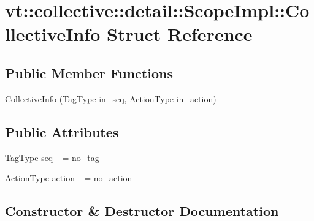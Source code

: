 \hypertarget{structvt_1_1collective_1_1detail_1_1_scope_impl_1_1_collective_info}{}\section{vt\+:\+:collective\+:\+:detail\+:\+:Scope\+Impl\+:\+:Collective\+Info Struct Reference}
\label{structvt_1_1collective_1_1detail_1_1_scope_impl_1_1_collective_info}
\subsection*{Public Member Functions}
\begin{DoxyCompactItemize}
\item 
\hyperlink{structvt_1_1collective_1_1detail_1_1_scope_impl_1_1_collective_info_a7f964b23eaf925f9ba8f9340fb65e51f}{Collective\+Info} (\hyperlink{namespacevt_a84ab281dae04a52a4b243d6bf62d0e52}{Tag\+Type} in\+\_\+seq, \hyperlink{namespacevt_ae0a5a7b18cc99d7b732cb4d44f46b0f3}{Action\+Type} in\+\_\+action)
\end{DoxyCompactItemize}
\subsection*{Public Attributes}
\begin{DoxyCompactItemize}
\item 
\hyperlink{namespacevt_a84ab281dae04a52a4b243d6bf62d0e52}{Tag\+Type} \hyperlink{structvt_1_1collective_1_1detail_1_1_scope_impl_1_1_collective_info_ae8212822c750374cb79a37fe0ef21d7e}{seq\+\_\+} = no\+\_\+tag
\item 
\hyperlink{namespacevt_ae0a5a7b18cc99d7b732cb4d44f46b0f3}{Action\+Type} \hyperlink{structvt_1_1collective_1_1detail_1_1_scope_impl_1_1_collective_info_a60c9ddcd8da8dbab5b66fcef3b6f8ce9}{action\+\_\+} = no\+\_\+action
\end{DoxyCompactItemize}


\subsection{Constructor \& Destructor Documentation}
\mbox{\label{structvt_1_1collective_1_1detail_1_1_scope_impl_1_1_collective_info_a7f964b23eaf925f9ba8f9340fb65e51f}} 
